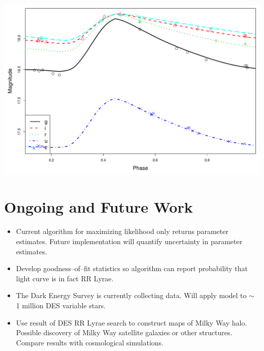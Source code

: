 \documentclass[a0,portrait]{a0poster}
\begin{document}
\begin{multicols}{2}
\begin{itemize}
\begin{center}\vspace{1cm}
\includegraphics[width=0.7\linewidth]{2_one.pdf}
\end{center}\vspace{1cm}



\end{itemize}

\section*{Ongoing and Future Work}

\begin{itemize}
\item Current algorithm for maximizing likelihood only returns parameter estimates. Future implementation will quantify uncertainty in parameter estimates.
\item Develop goodness--of--fit statistics so algorithm can report probability that light curve is in fact RR Lyrae.
\item The Dark Energy Survey is currently collecting data. Will apply model to $\sim$ 1 million DES variable stars.
\item Use result of DES RR Lyrae search to construct maps of Milky Way halo. Possible discovery of Milky Way satellite galaxies or other structures. Compare results with cosmological simulations.
\end{itemize}






\nocite{*} %


\end{multicols}
\end{document}
